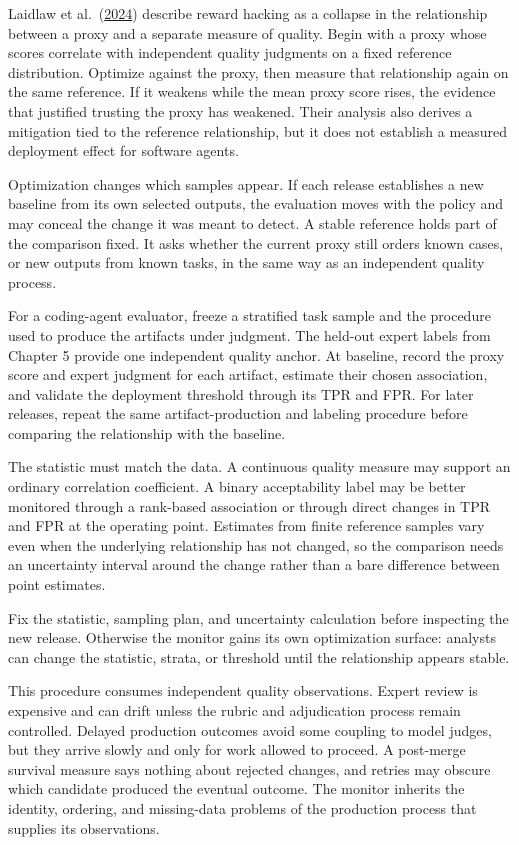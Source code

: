 Laidlaw et al.~(\href{https://arxiv.org/abs/2403.03185}{2024}) describe reward hacking as a collapse in the relationship between a proxy and a separate measure of quality. Begin with a proxy whose scores correlate with independent quality judgments on a fixed reference distribution. Optimize against the proxy, then measure that relationship again on the same reference. If it weakens while the mean proxy score rises, the evidence that justified trusting the proxy has weakened. Their analysis also derives a mitigation tied to the reference relationship, but it does not establish a measured deployment effect for software agents.

Optimization changes which samples appear. If each release establishes a new baseline from its own selected outputs, the evaluation moves with the policy and may conceal the change it was meant to detect. A stable reference holds part of the comparison fixed. It asks whether the current proxy still orders known cases, or new outputs from known tasks, in the same way as an independent quality process.

For a coding-agent evaluator, freeze a stratified task sample and the procedure used to produce the artifacts under judgment. The held-out expert labels from Chapter 5 provide one independent quality anchor. At baseline, record the proxy score and expert judgment for each artifact, estimate their chosen association, and validate the deployment threshold through its TPR and FPR. For later releases, repeat the same artifact-production and labeling procedure before comparing the relationship with the baseline.

The statistic must match the data. A continuous quality measure may support an ordinary correlation coefficient. A binary acceptability label may be better monitored through a rank-based association or through direct changes in TPR and FPR at the operating point. Estimates from finite reference samples vary even when the underlying relationship has not changed, so the comparison needs an uncertainty interval around the change rather than a bare difference between point estimates.

Fix the statistic, sampling plan, and uncertainty calculation before inspecting the new release. Otherwise the monitor gains its own optimization surface: analysts can change the statistic, strata, or threshold until the relationship appears stable.

This procedure consumes independent quality observations. Expert review is expensive and can drift unless the rubric and adjudication process remain controlled. Delayed production outcomes avoid some coupling to model judges, but they arrive slowly and only for work allowed to proceed. A post-merge survival measure says nothing about rejected changes, and retries may obscure which candidate produced the eventual outcome. The monitor inherits the identity, ordering, and missing-data problems of the production process that supplies its observations.

